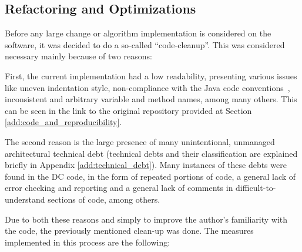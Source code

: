 \subsection{Refactoring and Optimizations} \label{ssec:refactoring_and_optimizations} %
Before any large change or algorithm implementation is considered on the software, it was decided to do a so-called ``code-cleanup''.
This was considered necessary mainly because of two reasons:

First, the current implementation had a low readability, presenting various issues like uneven indentation style, non-compliance with the Java code conventions~\cite{sun1997java}, inconsistent and arbitrary variable and method names, among many others.
This can be seen in the link to the original repository provided at Section \ref{add:code_and_reproducibility}.

The second reason is the large presence of many unintentional, unmanaged architectural technical debt (technical debts and their classification are explained briefly in Appendix \ref{add:technical_debt}).
Many instances of these debts were found in the DC code, in the form of repeated portions of code, a general lack of error checking and reporting and a general lack of comments in difficult-to-understand sections of code, among others.

Due to both these reasons and simply to improve the author's familiarity with the code, the previously mentioned clean-up was done.
The measures implemented in this process are the following:

